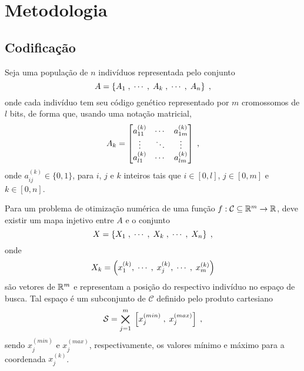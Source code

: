 \chapter{Metodologia}\label{cap_metodologia}

\section{Codificação}

\newcommand{\kth}[2]{{#1}^{(k)}_{#2}}
\newcommand{\kpth}[2]{{#1}^{(k + 1)}_{#2}}
\newcommand{\xmin}[1]{x^{(min)}_{#1}}
\newcommand{\xmax}[1]{x^{(max)}_{#1}}

Seja uma população de $n$ indivíduos representada pelo conjunto
\begin{equation}
  A = \left\{ A_1\;, \;\cdots\;,  \;A_k\;, \;\cdots\;, \;A_n \right\} \;\mathrm{,}
\end{equation}
onde cada indivíduo tem seu código genético representado por $m$ cromossomos
de $l$ bits, de forma que, usando uma notação matricial,
\begin{equation}
  A_k = \left[
    \begin{matrix}
      \kth{a}{11} & \cdots & \kth{a}{1m} \\
      \vdots      & \ddots & \vdots      \\
      \kth{a}{l1} & \cdots & \kth{a}{lm} \\
    \end{matrix}
    \right]
  \mathcomma
\end{equation}
onde $ \kth{a}{ij} \in \{0,1\} $, para $i$, $j$ e $k$ inteiros tais que
$ i \in \left[ 0, l \right] $, $ j \in \left[ 0, m \right] $ e $ k \in \left[ 0, n \right] $.

Para um problema de otimização numérica de uma função $ f : \mathcal{C} \subseteq \mathbb{R}^m \rightarrow \mathbb{R} $,
deve existir um mapa injetivo entre $A$ e o conjunto
\begin{equation}
  X = \left\{ X_1 \; , \;\cdots\;,  \; X_k \; , \;\cdots\;, \; X_n \right\} \;\mathrm{,}
\end{equation}
onde
\begin{equation}
  X_k = \left( \kth{x}{1}, \mathdots, \; \kth{x}{j}, \mathdots, \; \kth{x}{m} \right)
\end{equation}
são vetores de $ \mathbb{R}^m $ e representam a posição do respectivo indivíduo no espaço de busca.
Tal espaço é um subconjunto de $ \mathcal{C} $ definido pelo produto cartesiano
\begin{equation}
  \mathcal{S} = \bigtimes_{j = 1}^m \; \left[ \xmin{j} \; , \; \xmax{j} \right] \mathcomma
\end{equation}
sendo $ \xmin{j} $ e $ \xmax{j} $, respectivamente, os valores mínimo e máximo para
a coordenada $ \kth{x}{j} $.

